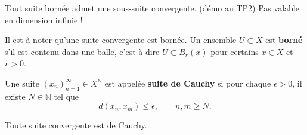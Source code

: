 \begin{theo}
    Tout suite bornée admet une sous-suite convergente. (démo au TP2) \danger Pas valable en dimension infinie !
\end{theo}

Il est à noter qu'une suite convergente est bornée. Un ensemble $U\subset X$ est \textbf{borné} s'il est contenu dans une balle, c'est-à-dire $U\subset B_r(x)$ pour certains $x\in X$ et $r>0$. \\


\begin{definition}
    Une suite $(x_n)_{n=1}^\infty\in X^\mathbb{N}$ est appelée \textbf{suite de Cauchy} si pour chaque $\epsilon>0$, il existe $N\in\mathbb{N}$ tel que
    \begin{equation*}
        d(x_n,x_m)\leq\epsilon,\qquad n,m\geq N.
    \end{equation*}
\end{definition}

\begin{theo}
    Toute suite convergente est de Cauchy.
\end{theo}

\noindent
{}\\

